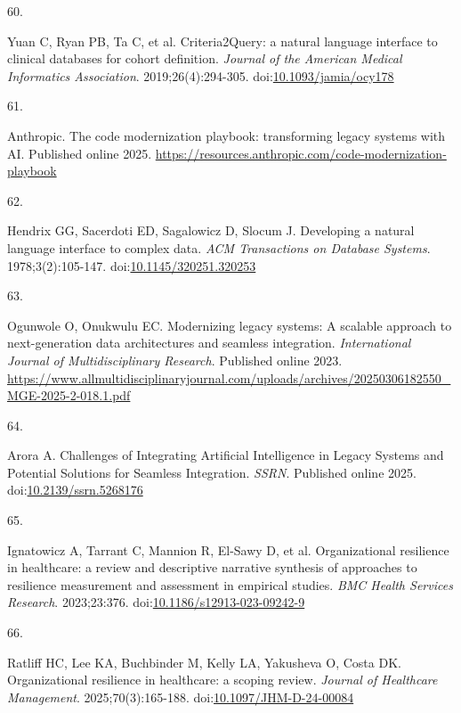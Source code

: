 \documentclass[
  american,
  11pt,
  letterpaper,
  oneside  ,captions=tableheading
]{scrartcl}
\newlength{\cslhangindent}
\newlength{\csllabelwidth}
\newenvironment{CSLReferences}[2] %
 {\begin{list}{}{%
  \setlength{\itemindent}{0pt}
  \setlength{\leftmargin}{0pt}
  \setlength{\parsep}{0pt}
  \ifodd #1
   \setlength{\leftmargin}{\cslhangindent}
   \setlength{\itemindent}{-1\cslhangindent}
  \fi
  \setlength{\itemsep}{#2\baselineskip}}}
 {\end{list}}
\newcommand{\CSLLeftMargin}[1]{\parbox[t]{\csllabelwidth}{\strut#1\strut}}
\newcommand{\CSLRightInline}[1]{\parbox[t]{\linewidth - \csllabelwidth}{\strut#1\strut}}
\begin{document}
\begin{CSLReferences}{0}{1}
\CSLLeftMargin{60. }%
\CSLRightInline{Yuan C, Ryan PB, Ta C, et al. {Criteria2Query: a natural
language interface to clinical databases for cohort definition}.
\emph{Journal of the American Medical Informatics Association}.
2019;26(4):294-305.
doi:\href{https://doi.org/10.1093/jamia/ocy178}{10.1093/jamia/ocy178}}

\CSLLeftMargin{61. }%
\CSLRightInline{Anthropic. {The code modernization playbook:
transforming legacy systems with {AI}}. Published online 2025.
\url{https://resources.anthropic.com/code-modernization-playbook}}

\CSLLeftMargin{62. }%
\CSLRightInline{Hendrix GG, Sacerdoti ED, Sagalowicz D, Slocum J.
{Developing a natural language interface to complex data}. \emph{{ACM}
Transactions on Database Systems}. 1978;3(2):105-147.
doi:\href{https://doi.org/10.1145/320251.320253}{10.1145/320251.320253}}

\CSLLeftMargin{63. }%
\CSLRightInline{Ogunwole O, Onukwulu EC. {Modernizing legacy systems: A
scalable approach to next-generation data architectures and seamless
integration}. \emph{International Journal of Multidisciplinary
Research}. Published online 2023.
\url{https://www.allmultidisciplinaryjournal.com/uploads/archives/20250306182550_MGE-2025-2-018.1.pdf}}

\CSLLeftMargin{64. }%
\CSLRightInline{Arora A. {Challenges of Integrating Artificial
Intelligence in Legacy Systems and Potential Solutions for Seamless
Integration}. \emph{{SSRN}}. Published online 2025.
doi:\href{https://doi.org/10.2139/ssrn.5268176}{10.2139/ssrn.5268176}}

\CSLLeftMargin{65. }%
\CSLRightInline{{Ignatowicz A, Tarrant C, Mannion R, El-Sawy D, et al.}
{Organizational resilience in healthcare: a review and descriptive
narrative synthesis of approaches to resilience measurement and
assessment in empirical studies}. \emph{BMC Health Services Research}.
2023;23:376.
doi:\href{https://doi.org/10.1186/s12913-023-09242-9}{10.1186/s12913-023-09242-9}}

\CSLLeftMargin{66. }%
\CSLRightInline{Ratliff HC, Lee KA, Buchbinder M, Kelly LA, Yakusheva O,
Costa DK. {Organizational resilience in healthcare: a scoping review}.
\emph{Journal of Healthcare Management}. 2025;70(3):165-188.
doi:\href{https://doi.org/10.1097/JHM-D-24-00084}{10.1097/JHM-D-24-00084}}


\end{CSLReferences}
\end{document}
